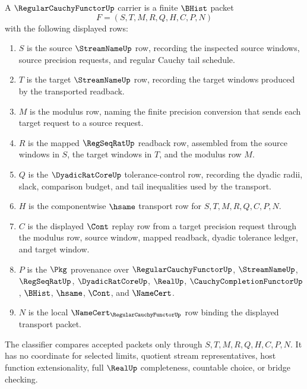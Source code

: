 \begin{definition}
\label{def:regular-cauchy-functor-carrier}
A $\RegularCauchyFunctorUp$ carrier is a finite $\BHist$ packet
$$
F=(S,T,M,R,Q,H,C,P,N)
$$
with the following displayed rows:
\begin{enumerate}
\item $S$ is the source $\StreamNameUp$ row, recording the inspected source windows, source precision requests, and regular Cauchy tail schedule.
\item $T$ is the target $\StreamNameUp$ row, recording the target windows produced by the transported readback.
\item $M$ is the modulus row, naming the finite precision conversion that sends each target request to a source request.
\item $R$ is the mapped $\RegSeqRatUp$ readback row, assembled from the source windows in $S$, the target windows in $T$, and the modulus row $M$.
\item $Q$ is the $\DyadicRatCoreUp$ tolerance-control row, recording the dyadic radii, slack, comparison budget, and tail inequalities used by the transport.
\item $H$ is the componentwise $\hsame$ transport row for $S,T,M,R,Q,C,P,N$.
\item $C$ is the displayed $\Cont$ replay row from a target precision request through the modulus row, source window, mapped readback, dyadic tolerance ledger, and target window.
\item $P$ is the $\Pkg$ provenance over $\RegularCauchyFunctorUp$, $\StreamNameUp$, $\RegSeqRatUp$, $\DyadicRatCoreUp$, $\RealUp$, $\CauchyCompletionFunctorUp$, $\BHist$, $\hsame$, $\Cont$, and $\NameCert$.
\item $N$ is the local $\NameCert_{\RegularCauchyFunctorUp}$ row binding the displayed transport packet.
\end{enumerate}
The classifier compares accepted packets only through $S,T,M,R,Q,H,C,P,N$. It has no coordinate for selected limits, quotient stream representatives, host function extensionality, full $\RealUp$ completeness, countable choice, or bridge checking.
\end{definition}

